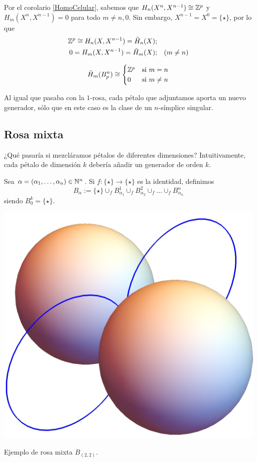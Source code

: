 Por el corolario \ref{HomoCelular}, sabemos que $H_n(X^n,X^{n-1})\cong 
\mathbb{Z}^p$ y\\ $H_m(X^n,X^{n-1})=0$ para todo $m\neq n,0$. Sin embargo, $X^{n-1}
=X^0=\{\star\}$, por lo que
\begin{align*}
\mathbb{Z}^p\cong H_n(X,X^{n-1})=\tilde H_n(X);\\
0=H_m(X,X^{n-1})=\tilde H_m(X); && (m\neq n)
\end{align*}

\begin{theorem}
\[\tilde H_m(B^n_p)\cong
\begin{cases}
\mathbb{Z}^p & \text{si $m=n$}\\
0 & \text{si $m\neq n$}
\end{cases}\]
\end{theorem}

Al igual que pasaba con la $1$-rosa, cada pétalo que adjuntamos aporta un nuevo
generador, sólo que en este caso es la clase de un $n$-símplice singular.

\subsection{Rosa mixta}
¿Qué pasaría si mezcláramos pétalos de diferentes dimensiones? Intuitivamente,
cada pétalo de dimensión $k$ debería añadir un generador de orden $k$.

Sea $\alpha=(\alpha_1,\dots,\alpha_n) \in \mathbb{N}^n$. Si $f\colon \{\star\} \to
\{\star\}$ es la identidad, definimos
\[B_\alpha:=\{\star\}\cup_f B^1_{\alpha_1}\cup_f B^2_{\alpha_2}\cup_f \dots
\cup_f B^n_{\alpha_n}\]
siendo $B^k_0=\{\star\}$.

\begin{marginfigure}
\includegraphics{figures/B22.png}
\caption{Ejemplo de rosa mixta $B_{(2,2)}$.}
\end{marginfigure}

